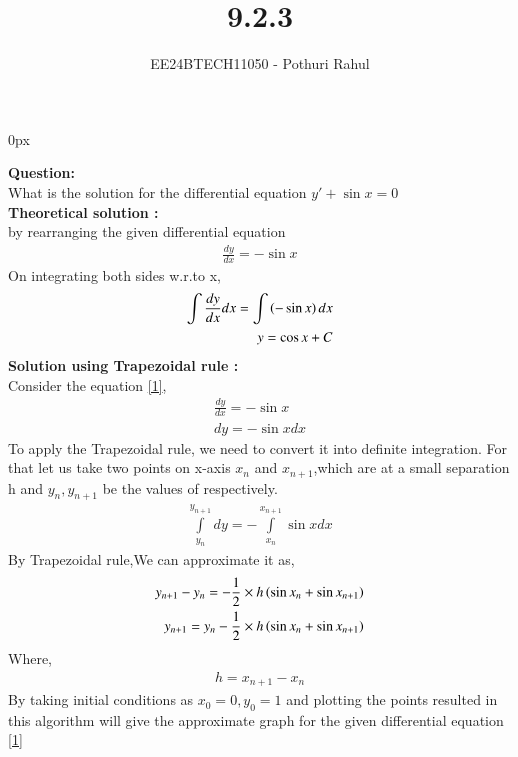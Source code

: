 \documentclass[journal]{IEEEtran}
\begin{document}

\vspace{3cm}
\parindent 0px

\title{9.2.3}
\author{EE24BTECH11050 - Pothuri Rahul}
{\let\newpage\relax\maketitle}

\renewcommand{\thefigure}{\theenumi}
\renewcommand{\thetable}{\theenumi}
\setlength{\intextsep}{10pt} %


\renewcommand{\thetable}{\theenumi}

\textbf{Question:} \\
What is the solution for the differential equation $y'+\sin{x}=0$
\solution \\
\textbf{Theoretical solution :} \\
by rearranging the given differential equation \\
\begin{align}
\frac{dy}{dx} = - \sin{x} \label{1}
\end{align}
On integrating both sides w.r.to x,
\begin{align}
\int \frac{dy}{dx} dx = \int \left(- \sin{x}\right) dx \\
y = \cos{x}+C
\end{align}
\textbf{Solution using Trapezoidal rule :} \\
Consider the equation \eqref{1},
\begin{align}
\frac{dy}{dx} = - \sin{x} \\
dy = -\sin{x}dx
\end{align}
To apply the Trapezoidal rule, we need to convert it into definite integration. For that let us take two points on x-axis $x_n$ and $x_{n+1}$,which are at a small separation h and $y_n , y_{n+1}$ be the values of respectively. \\
\begin{align}
\int\limits_{y_n} ^{y_{n+1}} dy = - \int\limits_{x_n} ^{x_{n+1}} \sin{x} dx
\end{align}
By Trapezoidal rule,We can approximate it as,
\begin{align}
y_{n+1}-y_n = - \frac{1}{2} \times h \left( \sin{x_n}+\sin{x_{n+1}}\right) \\
y_{n+1} = y_n- \frac{1}{2} \times h \left( \sin{x_n}+\sin{x_{n+1}}\right)
\end{align}
Where,
\begin{align}
h = x_{n+1} - x_n
\end{align}
By taking initial conditions as $x_0 = 0,y_0 = 1$ and plotting the points resulted in this algorithm will give the approximate graph for the given differential equation \eqref{1} \\
\end{document}
